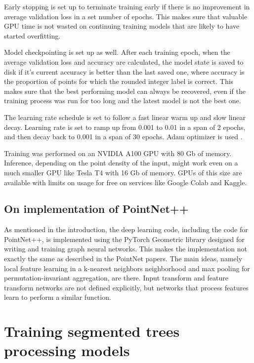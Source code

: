 Early stopping \citep{precheltAutomaticEarlyStopping1998} is set up to terminate training early if there is no improvement in average validation loss in a set number of epochs.
This makes sure that valuable GPU time is not wasted on continuing training models that are likely to have started overfitting.

Model checkpointing is set up as well.
After each training epoch, when the average validation loss and accuracy are calculated, the model state is saved to disk if it's current accuracy is better than the last saved one, where accuracy is the proportion of points for which the rounded integer label is correct.
This makes sure that the best performing model can always be recovered, even if the training process was run for too long and the latest model is not the best one.

The learning rate schedule is set to follow a fast linear warm up and slow linear decay.
Learning rate is set to ramp up from 0.001 to 0.01 in a span of 2 epochs, and then decay back to 0.001 in a span of 30 epochs.
Adam optimizer is used \citep{kingmaAdamMethodStochastic2014}.

Training was performed on an NVIDIA A100 GPU with 80 Gb of memory.
Inference, depending on the point density of the input, might work even on a much smaller GPU like Tesla T4 with 16 Gb of memory.
GPUs of this size are available with limits on usage for free on services like Google Colab and Kaggle.

\subsection{On implementation of PointNet++}

As mentioned in the introduction, the deep learning code, including the code for PointNet++, is implemented using the PyTorch Geometric library designed for writing and training graph neural networks.
This makes the implementation not exactly the same as described in the PointNet papers.
The main ideas, namely local feature learning in a k-nearest neighbors neighborhood and max pooling for permutation-invariant aggregation, are there.
Input transform and feature transform networks are not defined explicitly, but networks that process features learn to perform a similar function.

\section{Training segmented trees processing models}\label{sec-training-tree-processors}

